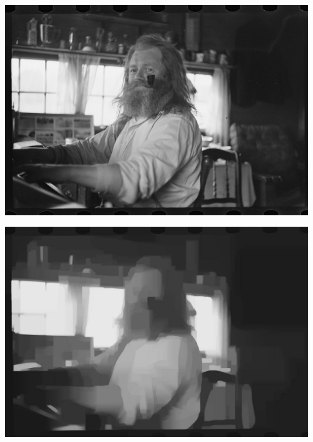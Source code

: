 \begin{frame}

\begin{center}
\includegraphics[width=\textwidth]{img/img0.jpg}
\end{center}

\end{frame}

\begin{frame}

\begin{center}
\includegraphics[width=\textwidth]{img/img1.jpg}
\end{center}

\end{frame}


